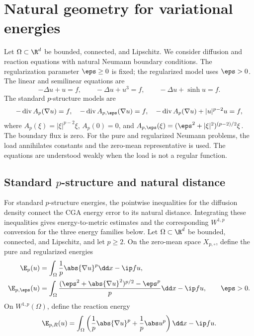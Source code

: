 \section{Natural geometry for variational energies}
\label{sec:pgeometry}

Let \(\Omega\subset\R^d\) be bounded, connected, and Lipschitz.
We consider diffusion and reaction equations with natural Neumann boundary conditions.
The regularization parameter \(\eps\geq0\) is fixed; the regularized model uses \(\eps>0\).
The linear and semilinear equations are
\[
-\Delta u+u=f,\qquad -\Delta u+u^3=f,\qquad -\Delta u+\sinh u=f.
\]
The standard \(p\)-structure models are
\[
-\operatorname{div}A_p(\nabla u)=f,\quad
-\operatorname{div}A_{p,\eps}(\nabla u)=f,\quad
-\operatorname{div}A_p(\nabla u)+|u|^{p-2}u=f,
\]
where \(A_p(\xi)=|\xi|^{p-2}\xi\), \(A_p(0)=0\), and
\(A_{p,\eps}(\xi)=(\eps^2+|\xi|^2)^{(p-2)/2}\xi\).
The boundary flux is zero. For the pure and regularized Neumann problems, the load annihilates constants and the zero-mean representative is used.
The equations are understood weakly when the load is not a regular function.



\subsection{Standard \texorpdfstring{\(p\)}{p}-structure and natural distance}

For standard \(p\)-structure energies, the pointwise inequalities for the diffusion density connect the CGA energy error to its natural distance. Integrating these inequalities gives energy-to-metric estimates and the corresponding \(W^{1,p}\) conversion for the three energy families below. Let \(\Omega\subset\R^d\) be bounded, connected, and Lipschitz, and let \(p\geq2\). On the zero-mean space \(X_{p,\circ}\), define the pure and regularized energies
\begin{align}
 \E_p(u)&=\int_\Omega\frac1p\abs{\nabla u}^p\dd x-\ip fu,
 \label{eq:pure-energy}\\
 \E_{p,\eps}(u)&=\int_\Omega
 \frac{(\eps^2+\abs{\nabla u}^2)^{p/2}-\eps^p}{p}\dd x-\ip fu,
 \qquad\eps>0.
 \label{eq:reg-energy}
\end{align}
On \(W^{1,p}(\Omega)\), define the reaction energy
\begin{equation}
 \E_{p,R}(u)=\int_\Omega\left(\frac1p\abs{\nabla u}^p+
 \frac1p\abs u^p\right)\dd x-\ip fu.
 \label{eq:reaction-energy}
\end{equation}

